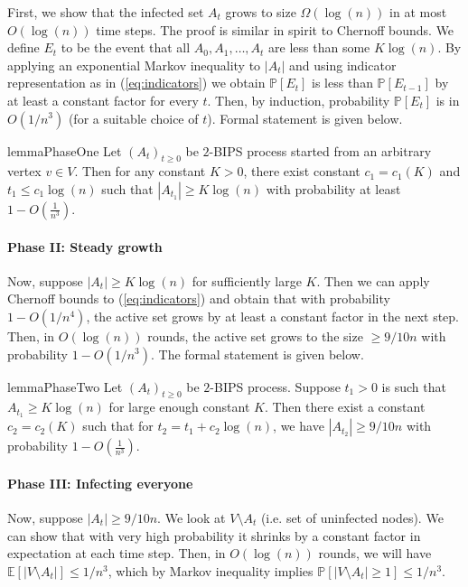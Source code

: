 \documentclass[11pt]{article}
\newcommand{\E}{\mathbb E}
\renewcommand{\Pr}{\mathbb P}
\theoremstyle{remark}
\begin{document}
First, we show that the infected set $A_t$ grows to size $\Omega(\log(n))$ in at most $O(\log(n))$ time steps. The proof is similar in spirit to Chernoff bounds. We define $E_t$ to be the event that all $A_0, A_1, \ldots, A_t$ are less than some $K\log(n)$. By applying an exponential Markov inequality to $|A_t|$ and using indicator representation as in (\ref{eq:indicators}) we obtain $\Pr[E_t]$ is less than $\Pr[E_{t-1}]$ by at least a constant factor for every $t$. Then, by induction, probability $\Pr[E_t]$ is in $O(1/n^3)$ (for a suitable choice of $t$). Formal statement is given below. 

\begin{restatable}{lemma}{PhaseOne}
    \label{lemma:phase1}
    Let $(A_t)_{t\ge 0}$ be $2$-BIPS process started from an arbitrary vertex $v\in V$. Then for any constant $K > 0$, there exist constant $c_1 = c_1(K)$ and $t_1 \le c_1\log(n)$ such that $|A_{t_1}| \ge K\log(n)$ with probability at least $1 - O\left(\frac{1}{n^3}\right)$. 
\end{restatable}

\paragraph{Phase II: Steady growth}

Now, suppose $|A_t| \ge K\log(n)$ for sufficiently large $K$. Then we can apply Chernoff bounds to (\ref{eq:indicators}) and obtain that with probability $1 - O(1/n^4)$, the active set grows by at least a constant factor in the next step. Then, in $O(\log(n))$ rounds, the active set grows to the size $\ge 9/10 n$ with probability $1 - O(1/n^3)$. The formal statement is given below.

\begin{restatable}{lemma}{PhaseTwo}
    \label{lemma:phase2}
    Let $(A_t)_{t\ge 0}$ be $2$-BIPS process. Suppose $t_1 > 0$ is such that $A_{t_1} \ge K\log(n)$ for large enough constant $K$. Then there exist a constant $c_2 = c_2(K)$ such that for $t_2 = t_1 + c_2\log(n)$, we have $|A_{t_2}| \ge 9/10 n$ with probability $1 - O\left(\frac{1}{n^3}\right)$.
\end{restatable}

\paragraph{Phase III: Infecting everyone}
Now, suppose $|A_t| \ge 9/10 n$. We look at $V\setminus A_t$ (i.e. set of uninfected nodes). We can show that with very high probability it shrinks by a constant factor in expectation at each time step. Then, in $O(\log(n))$ rounds, we will have $\E[|V\setminus A_t|] \le 1/n^3$, which by Markov inequality implies $\Pr[|V\setminus A_t| \ge 1] \le 1/n^3$.
\end{document}
